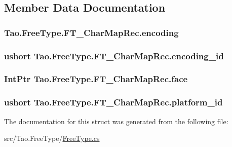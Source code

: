 \subsection{Member Data Documentation}
\hypertarget{struct_tao_1_1_free_type_1_1_f_t___char_map_rec_a71a60b259a077e779ae0f464dba01c30}{
\subsubsection[{encoding}]{ {\bf Tao.FreeType.FT\_\-CharMapRec.encoding}}}
\label{struct_tao_1_1_free_type_1_1_f_t___char_map_rec_a71a60b259a077e779ae0f464dba01c30}
\hypertarget{struct_tao_1_1_free_type_1_1_f_t___char_map_rec_ae85eefd9d84de309db04d5d77015159a}{
\subsubsection[{encoding\_\-id}]{\setlength{\rightskip}{0pt plus 5cm}ushort {\bf Tao.FreeType.FT\_\-CharMapRec.encoding\_\-id}}}
\label{struct_tao_1_1_free_type_1_1_f_t___char_map_rec_ae85eefd9d84de309db04d5d77015159a}
\hypertarget{struct_tao_1_1_free_type_1_1_f_t___char_map_rec_a950f625af8a76129a405c8ee6e610633}{
\subsubsection[{face}]{\setlength{\rightskip}{0pt plus 5cm}IntPtr {\bf Tao.FreeType.FT\_\-CharMapRec.face}}}
\label{struct_tao_1_1_free_type_1_1_f_t___char_map_rec_a950f625af8a76129a405c8ee6e610633}
\hypertarget{struct_tao_1_1_free_type_1_1_f_t___char_map_rec_a851cd7ad29f71be6237bae434592b1d2}{
\subsubsection[{platform\_\-id}]{\setlength{\rightskip}{0pt plus 5cm}ushort {\bf Tao.FreeType.FT\_\-CharMapRec.platform\_\-id}}}
\label{struct_tao_1_1_free_type_1_1_f_t___char_map_rec_a851cd7ad29f71be6237bae434592b1d2}


The documentation for this struct was generated from the following file:\begin{DoxyCompactItemize}
\item 
src/Tao.FreeType/\hyperlink{_free_type_8cs}{FreeType.cs}\end{DoxyCompactItemize}
